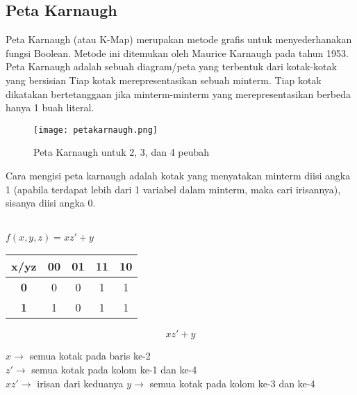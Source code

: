 \documentclass[11pt]{article}
\theoremstyle{definitionstyle}
\theoremstyle{theoremstyle}
\theoremstyle{examplestyle}
\begin{document}
\subsection{Peta Karnaugh}
Peta Karnaugh (atau K-Map) merupakan metode grafis untuk menyederhanakan fungsi Boolean. Metode ini ditemukan oleh Maurice Karnaugh pada tahun 1953.
Peta Karnaugh adalah sebuah diagram/peta yang terbentuk dari kotak-kotak yang bersisian
Tiap kotak merepresentasikan sebuah minterm. Tiap kotak dikatakan bertetanggaan jika minterm-minterm yang merepresentasikan berbeda hanya 1 buah literal.
\begin{figure}[h]
    \centering
    \texttt{[image: petakarnaugh.png]}
    \caption{Peta Karnaugh untuk 2, 3, dan 4 peubah}
\end{figure}
Cara mengisi peta karnaugh adalah kotak yang menyatakan minterm diisi angka 1 (apabila terdapat lebih dari 1 variabel dalam minterm, maka cari irisannya), sisanya diisi angka 0.
\begin{example} \hfill \\
    $f(x, y, z) = xz' + y$ \\
    \begin{center}
        \begin{tabular}{|c|c|c|c|c|}
            \hline
            \textbf{x/yz} & \textbf{00} & \textbf{01} & \textbf{11} & \textbf{10} \\ \hline
            \textbf{0}    & 0           & 0           & 1           & 1           \\ \hline
            \textbf{1}    & 1           & 0           & 1           & 1           \\ \hline
        \end{tabular}
        $$xz' + y$$
    \end{center}
    $x \rightarrow$ semua kotak pada baris ke-2 \\
    $z' \rightarrow$ semua kotak pada kolom ke-1 dan ke-4\\
    $xz'\rightarrow$ irisan dari keduanya
    $y  \rightarrow$ semua kotak pada kolom ke-3 dan ke-4\\
\end{example}
\end{document}
